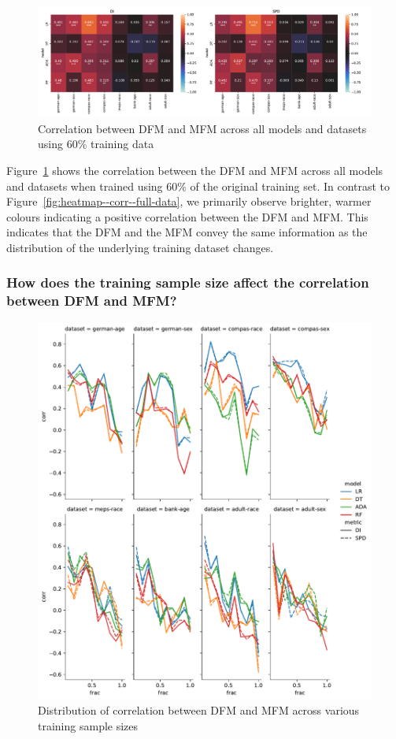 \documentclass{article}
\begin{document}
\begin{figure}
  \centering
  \includegraphics[width=0.95\linewidth]{heatmap--corr--training-sets-frac.pdf}
  \caption{Correlation between DFM and MFM across all models and
    datasets using 60\% training data}
  \label{fig:heatmap--corr--training-sets-frac}
\end{figure}

Figure \ref{fig:heatmap--corr--training-sets-frac} shows the
correlation between the DFM and MFM across all models and datasets
when trained using 60\% of the original training set. In contrast to
Figure \ref{fig:heatmap--corr--full-data}, we primarily observe
brighter, warmer colours indicating a positive correlation between the
DFM and MFM. This indicates that the DFM and the MFM convey the same
information as the distribution of the underlying training dataset
changes.

\subsubsection{How does the training sample size affect the correlation between DFM and MFM?}\label{sec:results-corr-frac}

\begin{figure}
  \centering
  \includegraphics[width=0.95\linewidth]{lineplot--frac--corr.pdf}
  \caption{Distribution of correlation between DFM and MFM across
    various training sample sizes}
  \label{fig:lineplot--frac--corr}
\end{figure}
\end{document}
